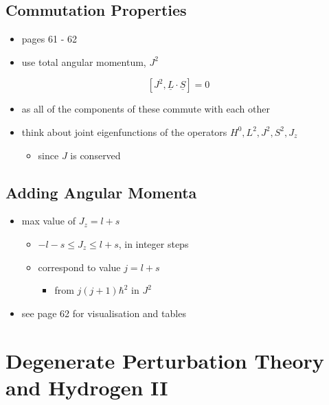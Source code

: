 \documentclass[a4paper,11pt,normalem]{article}
\begin{document}
\subsection{Commutation Properties}\label{commutation-properties}

\begin{itemize}
\item
  pages 61 - 62
\item
  use total angular momentum, \(J^2\)
\end{itemize}

\[
    [J^2, \underline{L}\cdot\underline{S}] = 0
\]

\begin{itemize}
\item
  as all of the components of these commute with each other
\item
  think about joint eigenfunctions of the operators
  \(H^0, L^2, J^2, S^2, J_z\)
  \begin{itemize}
  \item
    since \(J\) is conserved
  \end{itemize}
\end{itemize}

\subsection{Adding Angular Momenta}\label{adding-angular-momenta}

\begin{itemize}
\item
  max value of \(J_z = l + s\)
  \begin{itemize}
  \item
    \(-l - s \leq J_z \leq l + s\), in integer steps
  \item
    correspond to value \(j = l + s\)
    \begin{itemize}
    \item
      from \(j(j+ 1)\hbar^2\) in \(J^2\)
    \end{itemize}
  \end{itemize}
\item
  see page 62 for visualisation and tables
\end{itemize}

\section{Degenerate Perturbation Theory and Hydrogen II}\label{degenerate-perturbation-theory-and-hydrogen-ii}
\end{document}

